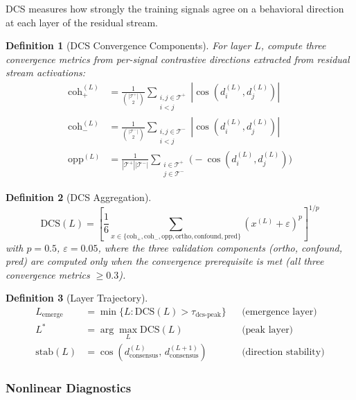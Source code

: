 \documentclass[11pt]{article}
\newtheorem{definition}{Definition}[section]
\begin{document}
DCS measures how strongly the training signals agree on a behavioral direction at each layer of the residual stream.

\begin{definition}[DCS Convergence Components]
For layer $L$, compute three convergence metrics from per-signal contrastive directions extracted from residual stream activations:
\begin{align}
\text{coh}_+^{(L)} &= \frac{1}{\binom{|\mathcal{T}^+|}{2}} \sum_{\substack{i,j \in \mathcal{T}^+ \\ i < j}} |\cos(d^{(L)}_i, d^{(L)}_j)| \\
\text{coh}_-^{(L)} &= \frac{1}{\binom{|\mathcal{T}^-|}{2}} \sum_{\substack{i,j \in \mathcal{T}^- \\ i < j}} |\cos(d^{(L)}_i, d^{(L)}_j)| \\
\text{opp}^{(L)} &= \frac{1}{|\mathcal{T}^+||\mathcal{T}^-|} \sum_{\substack{i \in \mathcal{T}^+ \\ j \in \mathcal{T}^-}} \bigl(-\cos(d^{(L)}_i, d^{(L)}_j)\bigr)
\end{align}
\end{definition}

\begin{definition}[DCS Aggregation]
\begin{equation}
\text{DCS}(L) = \left[\frac{1}{6}\sum_{x \in \{\text{coh}_+, \text{coh}_-, \text{opp}, \text{ortho}, \text{confound}, \text{pred}\}} (x^{(L)} + \varepsilon)^p\right]^{1/p}
\end{equation}
with $p = 0.5$, $\varepsilon = 0.05$, where the three validation components (ortho, confound, pred) are computed only when the convergence prerequisite is met (all three convergence metrics $\geq 0.3$).
\end{definition}

\begin{definition}[Layer Trajectory]
\begin{align}
L_{\text{emerge}} &= \min\{L : \text{DCS}(L) > \tau_{\text{dcs-peak}}\} & &\text{(emergence layer)} \\
L^* &= \arg\max_L \text{DCS}(L) & &\text{(peak layer)} \\
\text{stab}(L) &= \cos(d^{(L)}_{\text{consensus}},\, d^{(L+1)}_{\text{consensus}}) & &\text{(direction stability)}
\end{align}
\end{definition}

\subsubsection{Nonlinear Diagnostics}
\end{document}
